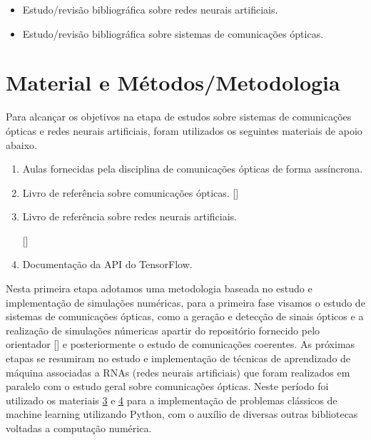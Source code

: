 \documentclass[12pt,openright,openany,oneside,article,a4paper,brazi]{abntex2}
\begin{document}
  \begin{itemize}
    \item Estudo/revisão bibliográfica sobre redes neurais artificiais.
    \item Estudo/revisão bibliográfica sobre sistemas de comunicações ópticas.
  \end{itemize}

\section*{Material e Métodos/Metodologia}

Para alcançar os objetivos na etapa de estudos sobre sistemas de comunicações ópticas e redes neurais artificiais, foram utilizados os seguintes 
materiais de apoio abaixo. 

  \begin{enumerate}
    \item Aulas fornecidas pela disciplina de comunicações ópticas de forma assíncrona. 
    \item Livro de referência sobre comunicações ópticas. []
    \item \hypertarget{label1}{Livro de referência sobre redes neurais artificiais.} []
    \item \hypertarget{label2}{Documentação da API do TensorFlow.}
  \end{enumerate}

Nesta primeira etapa adotamos uma metodologia baseada no estudo e implementação de simulações numéricas, para a primeira fase visamos o estudo
de sistemas de comunicações ópticas, como a geração e detecção de sinais ópticos e a realização de simulações númericas apartir do repositório 
fornecido pelo orientador [] e posteriormente o estudo de comunicações coerentes. As próximas etapas se resumiram no estudo e 
implementação de técnicas de aprendizado de máquina associadas a RNAs (redes neurais artificiais) que foram realizados em paralelo com o estudo geral sobre comunicações ópticas.
Neste período foi utilizado os materiais \hyperlink{label1}{3} e \hyperlink{label2}{4} para a implementação de problemas clássicos de machine learning utilizando Python, 
com o auxílio de diversas outras bibliotecas voltadas a computação numérica.
\end{document}
